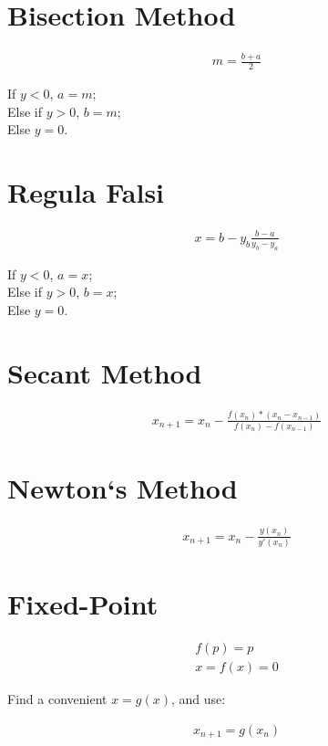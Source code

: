 \section{Bisection Method}

\begin{align}
	m = \frac{b+a}{2}
	\label{eq:bisection}
\end{align}

	\noindent If $y < 0$, $a = m$; \\
	Else if $y > 0$, $b = m$; \\
	Else $y = 0$. \\

\section{Regula Falsi}

\begin{align}
	x = b - y_{b}\frac{b - a}{y_{b} - y_{a}}
	\label{eq:regulafalsi}
\end{align}

	\noindent If $y < 0$, $a = x$; \\
	Else if $y > 0$, $b = x$; \\
	Else $y = 0$. \\

\section{Secant Method}

\begin{align}
	x_{n+1} = x_{n} - \frac{f(x_{n})*(x_{n}-x_{n-1})}{f(x_{n})-f(x_{n-1})}
	\label{eq:secant}
\end{align}

\section{Newton`s Method}

\begin{align}
	x_{n+1} = x_{n} - \frac{y(x_{n})}{y'(x_{n})}
	\label{eq:newton}
\end{align}

\section{Fixed-Point}

\begin{align}
	f(p) = p \\
	x = f(x) = 0
\end{align}

Find a convenient $x = g(x)$, and use:

\begin{align}
	x_{n+1} = g(x_{n})
\end{align}